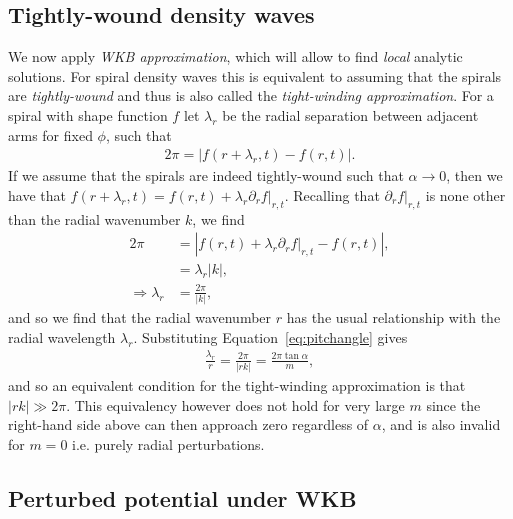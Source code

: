 \subsection{Tightly-wound density waves}

We now apply \textit{WKB approximation}, which will allow to find \textit{local} analytic solutions.
For spiral density waves this is equivalent to assuming that the spirals are \textit{tightly-wound} and thus is also called the \textit{tight-winding approximation}.
For a spiral with shape function $f$ let $\lambda_r$ be the radial separation between adjacent arms for fixed $\phi$, such that
\begin{align}
    2\pi = \left| f(r+\lambda_r, t) - f(r,t) \right|.
\end{align}
If we assume that the spirals are indeed tightly-wound such that $\alpha\rightarrow 0$, then we have that $f(r+\lambda_r,t)=f(r,t) + \lambda_r \partial_r f |_{r,t}$. 
Recalling that $\partial_r f |_{r,t}$ is none other than the radial wavenumber $k$, we find
\begin{align}
    2 \pi &= \left| f(r,t) + \lambda_r \partial_r f |_{r,t} - f(r,t) \right|, \\
    &= \lambda_r | k |, \\
    \Rightarrow \lambda_r &= \frac{2 \pi}{|k|},
\end{align}
and so we find that the radial wavenumber $r$ has the usual relationship with the radial wavelength $\lambda_r$. 
Substituting Equation~\eqref{eq:pitchangle} gives
\begin{align}
    \frac{\lambda_r}{r} = \frac{2 \pi}{|rk|} =  \frac{2 \pi \tan \alpha}{m},
\end{align}
and so an equivalent condition for the tight-winding approximation is that $|rk| \gg 2 \pi$. 
This equivalency however does not hold for very large $m$ since the right-hand side above can then approach zero regardless of $\alpha$, and is also invalid for $m = 0$ i.e. purely radial perturbations.

\subsection{Perturbed potential under WKB}

